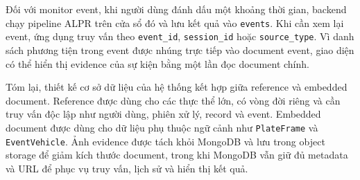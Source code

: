 Đối với monitor event, khi người dùng đánh dấu một khoảng thời gian, backend chạy pipeline ALPR trên cửa sổ đó và lưu kết quả vào \texttt{events}. Khi cần xem lại event, ứng dụng truy vấn theo \texttt{event\_id}, \texttt{session\_id} hoặc \texttt{source\_type}. Vì danh sách phương tiện trong event được nhúng trực tiếp vào document event, giao diện có thể hiển thị evidence của sự kiện bằng một lần đọc document chính.

Tóm lại, thiết kế cơ sở dữ liệu của hệ thống kết hợp giữa reference và embedded document. Reference được dùng cho các thực thể lớn, có vòng đời riêng và cần truy vấn độc lập như người dùng, phiên xử lý, record và event. Embedded document được dùng cho dữ liệu phụ thuộc ngữ cảnh như \texttt{PlateFrame} và \texttt{EventVehicle}. Ảnh evidence được tách khỏi MongoDB và lưu trong object storage để giảm kích thước document, trong khi MongoDB vẫn giữ đủ metadata và URL để phục vụ truy vấn, lịch sử và hiển thị kết quả.
